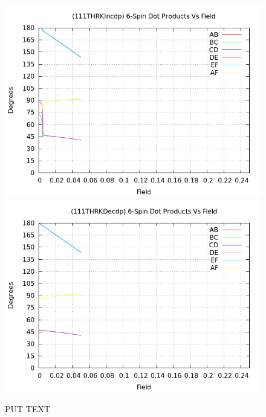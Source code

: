 \documentclass{article}
\begin{document}
\begin{figure}
\centering
\includegraphics[scale=0.55]{HVariedData/Pictures/111THRKIncdp.png}
\includegraphics[scale=0.55]{HVariedData/Pictures/111THRKDecdp.png}
\caption{PUT TEXT}
\end{figure}
\clearpage
\end{document}
